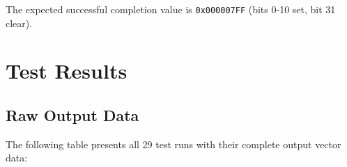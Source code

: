 \documentclass[11pt,a4paper]{article}
\begin{document}
The expected successful completion value is \texttt{0x000007FF} (bits 0-10 set, bit 31 clear).

\section{Test Results}

\subsection{Raw Output Data}

The following table presents all 29 test runs with their complete output vector data:
\end{document}
